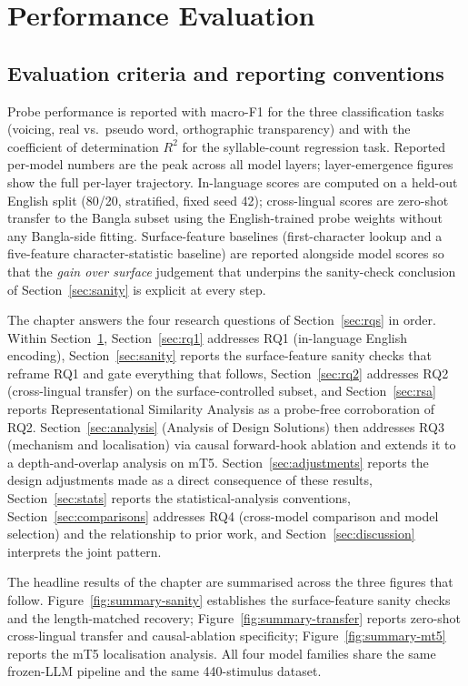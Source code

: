 \section{Performance Evaluation}
\label{sec:perf-eval}

\subsection{Evaluation criteria and reporting conventions}

Probe performance is reported with macro-F1 for the three classification tasks (voicing, real vs.\ pseudo word, orthographic transparency) and with the coefficient of determination $R^2$ for the syllable-count regression task. Reported per-model numbers are the peak across all model layers; layer-emergence figures show the full per-layer trajectory. In-language scores are computed on a held-out English split (80/20, stratified, fixed seed 42); cross-lingual scores are zero-shot transfer to the Bangla subset using the English-trained probe weights without any Bangla-side fitting. Surface-feature baselines (first-character lookup and a five-feature character-statistic baseline) are reported alongside model scores so that the \emph{gain over surface} judgement that underpins the sanity-check conclusion of Section~\ref{sec:sanity} is explicit at every step.

The chapter answers the four research questions of Section~\ref{sec:rqs} in order. Within Section~\ref{sec:perf-eval}, Section~\ref{sec:rq1} addresses RQ1 (in-language English encoding), Section~\ref{sec:sanity} reports the surface-feature sanity checks that reframe RQ1 and gate everything that follows, Section~\ref{sec:rq2} addresses RQ2 (cross-lingual transfer) on the surface-controlled subset, and Section~\ref{sec:rsa} reports Representational Similarity Analysis as a probe-free corroboration of RQ2. Section~\ref{sec:analysis} (Analysis of Design Solutions) then addresses RQ3 (mechanism and localisation) via causal forward-hook ablation and extends it to a depth-and-overlap analysis on mT5. Section~\ref{sec:adjustments} reports the design adjustments made as a direct consequence of these results, Section~\ref{sec:stats} reports the statistical-analysis conventions, Section~\ref{sec:comparisons} addresses RQ4 (cross-model comparison and model selection) and the relationship to prior work, and Section~\ref{sec:discussion} interprets the joint pattern.

The headline results of the chapter are summarised across the three figures that follow. Figure~\ref{fig:summary-sanity} establishes the surface-feature sanity checks and the length-matched recovery; Figure~\ref{fig:summary-transfer} reports zero-shot cross-lingual transfer and causal-ablation specificity; Figure~\ref{fig:summary-mt5} reports the mT5 localisation analysis. All four model families share the same frozen-LLM pipeline and the same 440-stimulus dataset.

